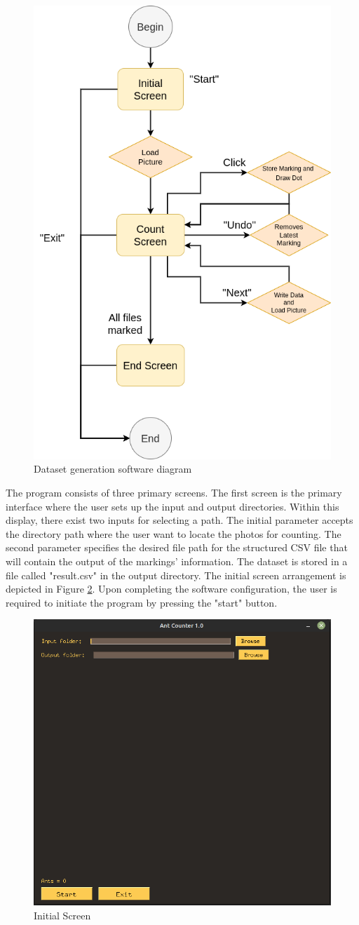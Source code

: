 \begin{figure}[h!]
    \centering
    \includegraphics[width = .5\linewidth]{Figures/ant-counter.png}
    \caption{Dataset generation software diagram}
    \label{fig:ant-counter-diag}
\end{figure}

The program consists of three primary screens. The first screen is the primary interface where the user sets up the input and output directories. Within this display, there exist two inputs for selecting a path. The initial parameter accepts the directory path where the user want to locate the photos for counting. The second parameter specifies the desired file path for the structured CSV file that will contain the output of the markings' information. The dataset is stored in a file called "result.csv" in the output directory. The initial screen arrangement is depicted in Figure \ref{fig:init-screen}. Upon completing the software configuration, the user is required to initiate the program by pressing the "start" button.

\begin{figure}[h!]
    \centering
    \includegraphics[width = .6\linewidth]{Figures/screen-1.png}
    \caption{Initial Screen}
    \label{fig:init-screen}
\end{figure}

